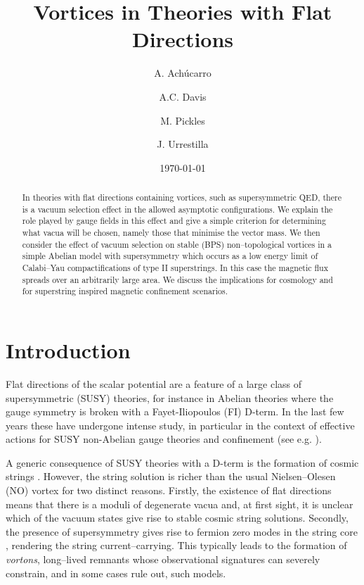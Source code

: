 \documentclass[a4paper,aps,prd,superscriptaddress,floats]{revtex4}
\begin{document}
\title{Vortices in Theories with Flat Directions}
\author{A. Ach\'{u}carro}
\author{A.C. Davis}
\author{M. Pickles}
\author{J. Urrestilla}
\date{\today}
\begin{abstract}

In theories with flat directions containing vortices, such as
supersymmetric QED, there is a vacuum selection effect in the allowed
asymptotic configurations. We explain the role played by gauge fields
in this effect and give a simple criterion for determining what vacua
will be chosen, namely those that minimise the vector mass.  We then
consider the effect of vacuum selection on stable (BPS)
non--topological vortices in a simple Abelian model with \coordHE{}
supersymmetry which occurs as a low energy limit of Calabi--Yau
compactifications of type II superstrings.  In this case the magnetic
flux spreads over an arbitrarily large area.  We discuss the
implications for cosmology and for superstring inspired magnetic
confinement scenarios.

\end{abstract}

\maketitle

\section{Introduction}
Flat directions of the scalar potential are a feature of a large class of
supersymmetric (SUSY) theories, for instance in Abelian theories
where the gauge symmetry is broken with a Fayet-Iliopoulos (FI) D-term. 
In the last few years these have undergone intense study, in particular 
in the context of effective actions for SUSY non-Abelian gauge theories
and confinement (see e.g. \cite{W.,dterm}).

A generic consequence of SUSY theories with a D-term is the formation of
cosmic strings \cite{PRTT96,DDT97}. However, the string solution is
richer than the usual Nielsen--Olesen (NO) vortex \cite{A57,NO73} for
two distinct reasons. Firstly, the existence of flat directions means
that there is a moduli of degenerate vacua and, at first sight, it is
unclear which of the vacuum states give rise to stable cosmic string
solutions. Secondly, the presence of supersymmetry gives rise to
fermion zero modes in the string core \cite{DDT97}, rendering the
string current--carrying. This typically leads to the formation of
{\it vortons}, long--lived remnants whose observational signatures can
severely constrain, and in some cases rule out, such models\cite{chiralvorton}.
\end{document}
